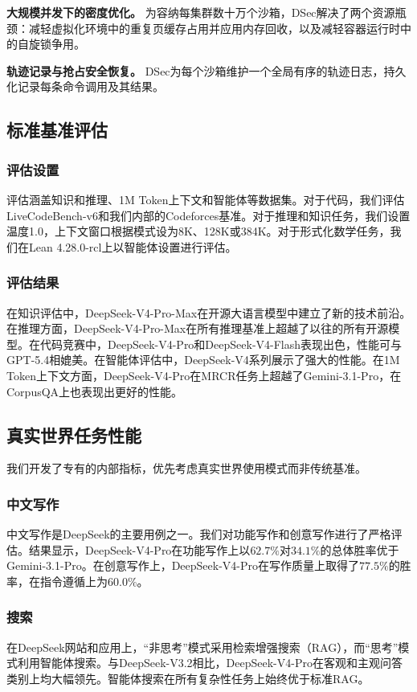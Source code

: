 \documentclass[11pt,a4paper]{article}
\newcommand{\dsvfour}{DeepSeek-V4}
\newcommand{\dsvfourpro}{DeepSeek-V4-Pro}
\newcommand{\dsvfourflash}{DeepSeek-V4-Flash}
\newcommand{\dsvfourpromax}{DeepSeek-V4-Pro-Max}
\newcommand{\dsvthreetwo}{DeepSeek-V3.2}
\begin{document}
\textbf{大规模并发下的密度优化。} 为容纳每集群数十万个沙箱，DSec解决了两个资源瓶颈：减轻虚拟化环境中的重复页缓存占用并应用内存回收，以及减轻容器运行时中的自旋锁争用。

\textbf{轨迹记录与抢占安全恢复。} DSec为每个沙箱维护一个全局有序的轨迹日志，持久化记录每条命令调用及其结果。

\subsection{标准基准评估}
\subsubsection{评估设置}
评估涵盖知识和推理、1M Token上下文和智能体等数据集。对于代码，我们评估LiveCodeBench-v6和我们内部的Codeforces基准。对于推理和知识任务，我们设置温度1.0，上下文窗口根据模式设为8K、128K或384K。对于形式化数学任务，我们在Lean 4.28.0-rcl上以智能体设置进行评估。

\subsubsection{评估结果}
在知识评估中，\dsvfourpromax 在开源大语言模型中建立了新的技术前沿。在推理方面，\dsvfourpromax 在所有推理基准上超越了以往的所有开源模型。在代码竞赛中，\dsvfourpro 和\dsvfourflash 表现出色，性能可与GPT-5.4相媲美。在智能体评估中，\dsvfour 系列展示了强大的性能。在1M Token上下文方面，\dsvfourpro 在MRCR任务上超越了Gemini-3.1-Pro，在CorpusQA上也表现出更好的性能。

\subsection{真实世界任务性能}
我们开发了专有的内部指标，优先考虑真实世界使用模式而非传统基准。

\subsubsection{中文写作}
中文写作是DeepSeek的主要用例之一。我们对功能写作和创意写作进行了严格评估。结果显示，\dsvfourpro 在功能写作上以\(62.7\%\)对\(34.1\%\)的总体胜率优于Gemini-3.1-Pro。在创意写作上，\dsvfourpro 在写作质量上取得了\(77.5\%\)的胜率，在指令遵循上为\(60.0\%\)。

\subsubsection{搜索}
在DeepSeek网站和应用上，“非思考”模式采用检索增强搜索（RAG），而“思考”模式利用智能体搜索。与\dsvthreetwo 相比，\dsvfourpro 在客观和主观问答类别上均大幅领先。智能体搜索在所有复杂性任务上始终优于标准RAG。
\end{document}
